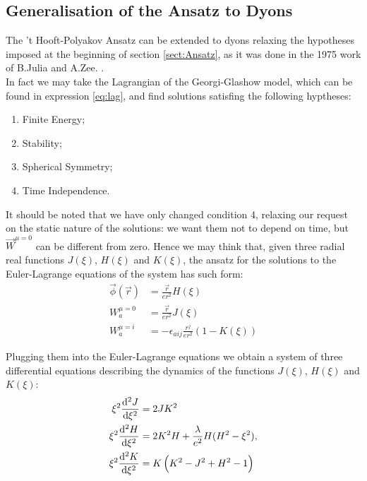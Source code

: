 \documentclass[main.tex]{subfiles}
\begin{document}
\subsection{Generalisation of the Ansatz to Dyons}
The 't Hooft-Polyakov Ansatz can be extended to dyons relaxing the hypotheses imposed at the beginning of section \ref{sect:Ansatz}, as it was done in the 1975 work of B.Julia and A.Zee. \cite{Julia:Dyon}.\\

In fact we may take the Lagrangian of the Georgi-Glashow model, which can be found in expression \ref{eq:lag}, and find solutions satisfing the following hyptheses:
 \begin{enumerate}
     \item Finite Energy; 
     \item Stability; 
     \item Spherical Symmetry;
     \item Time Independence.
 \end{enumerate}
 It should be noted that we have only changed condition 4, relaxing our request on the static nature of the solutions: we want them not to depend on time, but $\vec{W}^{\mu=0}$ can be different from zero. Hence we may think that, given three radial real functions $J(\xi)$, $H(\xi)$ and $K(\xi)$, the ansatz for the solutions to the Euler-Lagrange equations of the system has such form:
   \begin{align}
      \vec{\phi}(\vec{r}) &= \frac{\vec{r}}{er^2}H(\xi) \\ 
      W^{\mu=0}_{a}&= \frac{\vec{r}}{er^2}J(\xi) \\  
      W^{\mu =i}_{a} &= - \epsilon_{aij}\frac{r^j}{er^2}(1 - K(\xi)) 
  \end{align}
  
  Plugging  them into the Euler-Lagrange equations we obtain a system of three differential equations describing the dynamics of the functions $J(\xi)$, $H(\xi)$ and $K(\xi)$: 
%
\begin{subequations} \label{eq:dyon-equations} 
 \begin{align}
  \xi ^2 \dv[2]{J}{\xi} &= 2JK^2   \label{eq:J2}\\
  \xi ^2 \dv[2]{H}{\xi} &= 2K^2H + \frac{\lambda}{e^2}H (H^2 -\xi^2), \label{eq:H2}\\
  \xi ^2 \dv[2]{K}{\xi} &= K \left( K ^2 -J^2 + H^2 -1   \right)  \label{eq:K2}
  \end{align}
\end{subequations}
\end{document}
